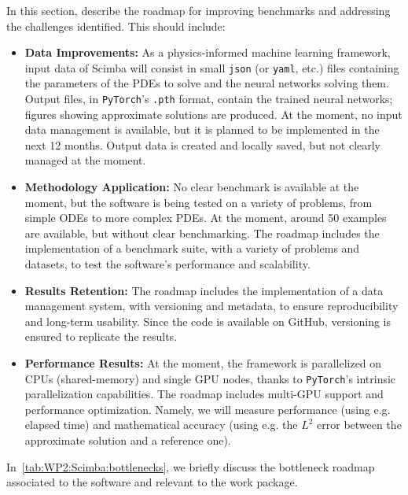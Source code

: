 In this section, describe the roadmap for improving benchmarks and addressing the challenges identified. This should include:
\begin{itemize}
    \item \textbf{Data Improvements:} As a physics-informed machine learning framework, input data of Scimba will consist in small \texttt{json} (or \texttt{yaml}, etc.) files containing the parameters of the PDEs to solve and the neural networks solving them. Output files, in \texttt{PyTorch}'s \texttt{.pth} format, contain the trained neural networks; figures showing approximate solutions are produced. At the moment, no input data management is available, but it is planned to be implemented in the next 12 months. Output data is created and locally saved, but not clearly managed at the moment.
    \item \textbf{Methodology Application:} No clear benchmark is available at the moment, but the software is being tested on a variety of problems, from simple ODEs to more complex PDEs. At the moment, around 50 examples are available, but without clear benchmarking. The roadmap includes the implementation of a benchmark suite, with a variety of problems and datasets, to test the software's performance and scalability.
    \item \textbf{Results Retention:} The roadmap includes the implementation of a data management system, with versioning and metadata, to ensure reproducibility and long-term usability. Since the code is available on GitHub, versioning is ensured to replicate the results.
    \item \textbf{Performance Results:} At the moment, the framework is parallelized on CPUs (shared-memory) and single GPU nodes, thanks to \texttt{PyTorch}'s intrinsic parallelization capabilities.
          The roadmap includes multi-GPU support and performance optimization.
          Namely, we will measure performance (using e.g. elapsed time) and mathematical accuracy (using e.g. the $L^2$ error between the approximate solution and a reference one).
\end{itemize}

In~\cref{tab:WP2:Scimba:bottlenecks}, we briefly discuss the bottleneck roadmap associated to the software and relevant to the work package.

